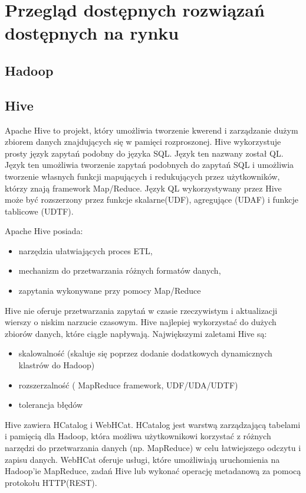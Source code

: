 \section{Przegląd dostępnych rozwiązań dostępnych na rynku}
\label{sec:solutions}



\subsection{Hadoop}
\label{sec:solutions:hadoop}



\subsection{Hive}
\label{sec:solutions:hive}
Apache Hive to projekt, który umożliwia tworzenie kwerend i zarządzanie dużym zbiorem danych znajdujących się w pamięci rozproszonej. Hive wykorzystuje prosty język zapytań podobny do języka SQL. Język ten nazwany został QL. Język ten umożliwia tworzenie zapytań podobnych do zapytań SQL i umożliwia tworzenie własnych funkcji mapujących i redukujących przez użytkowników, którzy znają framework Map/Reduce. Język QL wykorzystywany przez Hive może być rozszerzony przez funkcje skalarne(UDF), agregujące (UDAF) i funkcje tablicowe (UDTF).

Apache Hive posiada:
\begin{itemize}[noitemsep]
\item narzędzia ułatwiających proces ETL,
\item mechanizm do przetwarzania różnych formatów danych,
\item zapytania wykonywane przy pomocy Map/Reduce
\end{itemize}

Hive nie oferuje przetwarzania zapytań w czasie rzeczywistym i aktualizacji wierszy o niskim narzucie czasowym. Hive najlepiej wykorzystać do dużych zbiorów danych, które ciągle napływają. Największymi zaletami Hive są:
\begin{itemize}[noitemsep]
\item skalowalność (skaluje się poprzez dodanie dodatkowych dynamicznych klastrów do Hadoop)
\item rozszerzalność ( MapReduce framework, UDF/UDA/UDTF)
\item tolerancja błędów
\end{itemize}
Hive zawiera HCatalog i WebHCat. HCatalog jest warstwą zarządzającą tabelami i pamięcią dla Hadoop, która możliwa użytkownikowi korzystać z różnych narzędzi do przetwarzania danych (np. MapReduce) w celu łatwiejszego odczytu i zapisu danych. WebHCat oferuje usługi, które umożliwiają uruchomienia na Hadoop'ie MapReduce, zadań Hive lub wykonać operację metadanową za pomocą protokołu HTTP(REST).


